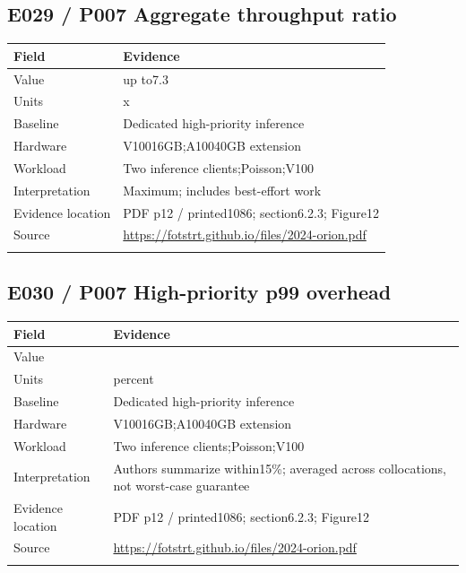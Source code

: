 \subsection*{E029 / P007 Aggregate throughput ratio}

\begin{longtable}{>{\raggedright\arraybackslash}p{}>{\raggedright\arraybackslash}p{}}
\toprule
\textbf{Field} & \textbf{Evidence}\\\midrule\endhead
Value & up to7.3\\\addlinespace
Units & x\\\addlinespace
Baseline & Dedicated high-priority inference\\\addlinespace
Hardware & V10016GB;A10040GB extension\\\addlinespace
Workload & Two inference clients;Poisson;V100\\\addlinespace
Interpretation & Maximum; includes best-effort work\\\addlinespace
Evidence location & PDF p12 / printed1086; section6.2.3; Figure12\\\addlinespace
Source & \url{https://fotstrt.github.io/files/2024-orion.pdf}\\\addlinespace
\bottomrule\end{longtable}

\subsection*{E030 / P007 High-priority p99 overhead}

\begin{longtable}{>{\raggedright\arraybackslash}p{}>{\raggedright\arraybackslash}p{}}
\toprule
\textbf{Field} & \textbf{Evidence}\\\midrule\endhead
Value & 15\\\addlinespace
Units & percent\\\addlinespace
Baseline & Dedicated high-priority inference\\\addlinespace
Hardware & V10016GB;A10040GB extension\\\addlinespace
Workload & Two inference clients;Poisson;V100\\\addlinespace
Interpretation & Authors summarize within15\%; averaged across collocations, not worst-case guarantee\\\addlinespace
Evidence location & PDF p12 / printed1086; section6.2.3; Figure12\\\addlinespace
Source & \url{https://fotstrt.github.io/files/2024-orion.pdf}\\\addlinespace
\bottomrule\end{longtable}


